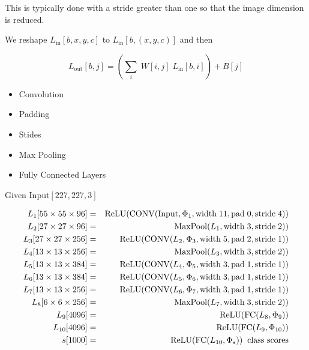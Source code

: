 {\vfill
This is typically done with a stride greater than one so that the image dimension is reduced.




We reshape $L_{\mathrm{in}}[b,x,y,c]$ to $L_{\mathrm{in}}[b,(x,y,c)]$ and then

\vfill
$$L_{\mathrm{out}}[b,j] = \left(\sum_i \;W[i,j]\;L_{\mathrm{in}}[b,i]\right) + B[j]$$

\begin{itemize}
\item Convolution

\vfill
\item Padding

  \vfill
\item Stides

  \vfill
\item Max Pooling

  \vfill
\item Fully Connected Layers
\end{itemize}

{\huge
\centerline{Given Input$[227,227,3]$}

\begin{eqnarray*}
L_1[55 \times 55 \times 96] & = & \mathrm{ReLU}(\mathrm{CONV}(\mathrm{Input},\Phi_1,\mathrm{width}\;11,\mathrm{pad}\;0,\mathrm{stride}\;4)) \\
L_2[27 \times 27 \times 96] & = & \mathrm{MaxPool}(L_1,\mathrm{width}\;3,\mathrm{stride}\;2))  \\
L_3[27 \times 27 \times 256] & = & \mathrm{ReLU}(\mathrm{CONV}(L_2,\Phi_3,\mathrm{width}\;5,\mathrm{pad}\;2,\mathrm{stride}\;1))  \\
L_4[13 \times 13 \times 256] & = & \mathrm{MaxPool}(L_3,\mathrm{width}\;3,\mathrm{stride}\;2))  \\
L_5[13 \times 13 \times 384] & = & \mathrm{ReLU}(\mathrm{CONV}(L_4,\Phi_5,\mathrm{width}\;3,\mathrm{pad}\;1,\mathrm{stride}\;1))  \\
L_6[13 \times 13 \times 384] & = & \mathrm{ReLU}(\mathrm{CONV}(L_5,\Phi_6,\mathrm{width}\;3,\mathrm{pad}\;1,\mathrm{stride}\;1))  \\
L_7[13 \times 13 \times 256] & = & \mathrm{ReLU}(\mathrm{CONV}(L_6,\Phi_7,\mathrm{width}\;3,\mathrm{pad}\;1,\mathrm{stride}\;1))  \\
L_8[6 \times 6 \times 256] & = & \mathrm{MaxPool}(L_7,\mathrm{width}\;3,\mathrm{stride}\;2)) \\
L_9[4096] & = & \mathrm{ReLU}(\mathrm{FC}(L_8,\Phi_9)) \\
L_{10}[4096] & = & \mathrm{ReLU}(\mathrm{FC}(L_9,\Phi_{10})) \\
s[1000] & = & \mathrm{ReLU}(\mathrm{FC}(L_{10},\Phi_s)) \;\;\mbox{class scores}
\end{eqnarray*}
}

}
